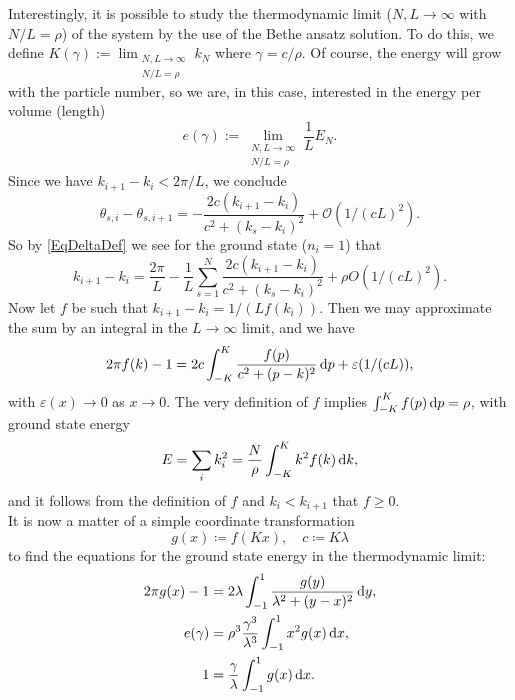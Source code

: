 Interestingly, it is possible to study the thermodynamic limit ($ N,L\to\infty $ with $ N/L=\rho $) of the system by the use of the Bethe ansatz solution. To do this, we define $ K(\gamma):=\lim_{\substack{N,L\to\infty\\
		N/L=\rho}}k_N $ where $ \gamma=c/\rho $. Of course, the energy will grow with the particle number, so we are, in this case, interested in the energy per volume (length)
\begin{equation}\label{}
e(\gamma):=\lim_{\substack{N,L\to\infty\\
N/L=\rho}} \frac{1}{L}E_N.
\end{equation}
Since we have $ k_{i+1}-k_i<2\pi/L $, we conclude\begin{equation}
\theta_{s,i}-\theta_{s,i+1}=-\frac{2c(k_{i+1}-k_i)}{c^2+(k_s-k_i)^2}+\mathcal{O}(1/(cL)^2).
\end{equation}
So by \eqref{EqDeltaDef} we see for the ground state ($ n_i=1 $) that \begin{equation}\label{EqPseudoMomentaDifferenceExpansion}
k_{i+1}-k_i=\frac{2\pi}{L}-\frac{1}{L}\sum_{s=1}^{N}\frac{2c(k_{i+1}-k_i)}{c^2+(k_s-k_i)^2}+\rho O(1/(cL)^2).
\end{equation}
Now let $ f $ be such that $ k_{i+1}-k_i=1/(Lf(k_i)) $. Then we may approximate the sum by an integral in the $L\to\infty$ limit, and we have \begin{equation}
2\pi f(k)-1=2c\int_{-K}^{K}\frac{f(p)}{c^2+(p-k)^2}\mathop{}\!\mathrm{d} p+\varepsilon(1/(cL)),
\end{equation}
with $\varepsilon(x)\to 0$ as $ x\to 0 $.
The very definition of $ f $ implies $ \int_{-K}^{K}f(p)\mathop{}\!\mathrm{d} p=\rho $, with ground state energy\begin{equation}
E=\sum_{i}k_i^2=\frac{N}{\rho}\int_{-K}^{K}k^2f(k)\mathop{}\!\mathrm{d} k,
\end{equation} 
and it follows from the definition of $ f $ and $ k_i<k_{i+1} $ that $ f\geq 0 $.\\
It is now a matter of a simple coordinate transformation\begin{equation}
g(x)\coloneqq f(Kx),\quad  c\coloneqq K\lambda
\end{equation}
to find the equations for the ground state energy in the thermodynamic limit:
\begin{align}
2\pi g(x)-1&=2\lambda\int_{-1}^{1}\frac{g(y)}{\lambda^2+(y-x)^2}\mathop{}\!\mathrm{d} y\label{EqLLEq1},\\
e(\gamma)&=\rho^3\frac{\gamma^3}{\lambda^3}\int_{-1}^{1}x^2 g(x)\mathop{}\!\mathrm{d} x\label{EqLLEq2},\\
1&=\frac{\gamma}{\lambda}\int_{-1}^{1}g(x)\mathop{}\!\mathrm{d} x.\label{EqLLEq3}
\end{align}
